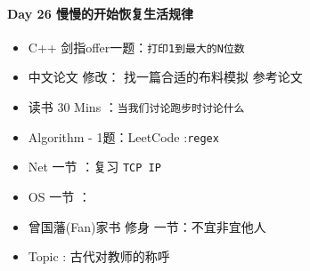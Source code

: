 \documentclass[UTF8,a4paper,8pt]{ctexart}
\begin{document}
 	 \paragraph{Day 26  慢慢的开始恢复生活规律  \quad     }
		 	 \begin{itemize}[itemindent = 1em]
		 	 	\renewcommand\labelitemi{\makebox[0pt][l]{$\square$}\hspace{1em}} 
		 	 	\renewcommand\labelitemi{\makebox[0pt][l]{$\square$}\raisebox{.15ex}{\hspace{0.1em}$\checkmark$}}	 	
		 	 	\item   C++ 剑指offer一题：\verb|打印1到最大的N位数|
		 	 	\item   中文论文 修改： 找一篇合适的布料模拟 参考论文
		 	 	
		 	 	\item   读书  30 Mins	：\verb|当我们讨论跑步时讨论什么|
		 	 	\item   Algorithm - 1题：LeetCode :\verb|regex|	
		 	 	\item   Net 一节 ：复习 \verb|TCP IP|	
		 	 	\renewcommand\labelitemi{\makebox[0pt][l]{$\square$}\hspace{1em}} 
		 	 	
		 	 	\item   OS  一节 ：
		 	 	
		 	 	\renewcommand\labelitemi{\makebox[0pt][l]{$\square$}\raisebox{.15ex}{\hspace{0.1em}$\checkmark$}}
		 	 	\item   曾国藩(Fan)家书 修身 一节：不宜非宜他人
		 	 	\item   Topic : 古代对教师的称呼
		 	 \end{itemize}
\end{document}

